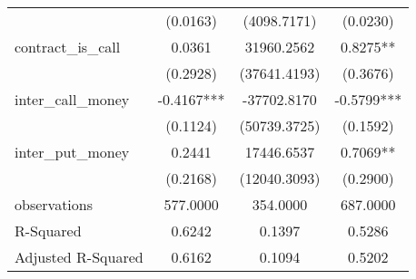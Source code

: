 \begin{tabular}{lccc}
                   & (0.0163)            & (4098.7171)         & (0.0230)            \\
contract\_is\_call & 0.0361              & 31960.2562          & 0.8275**            \\
                   & (0.2928)            & (37641.4193)        & (0.3676)            \\
inter\_call\_money & -0.4167***          & -37702.8170         & -0.5799***          \\
                   & (0.1124)            & (50739.3725)        & (0.1592)            \\
inter\_put\_money  & 0.2441              & 17446.6537          & 0.7069**            \\
                   & (0.2168)            & (12040.3093)        & (0.2900)            \\
observations       & 577.0000            & 354.0000            & 687.0000            \\
R-Squared          & 0.6242              & 0.1397              & 0.5286              \\
Adjusted R-Squared & 0.6162              & 0.1094              & 0.5202              \\
\hline
\end{tabular}
